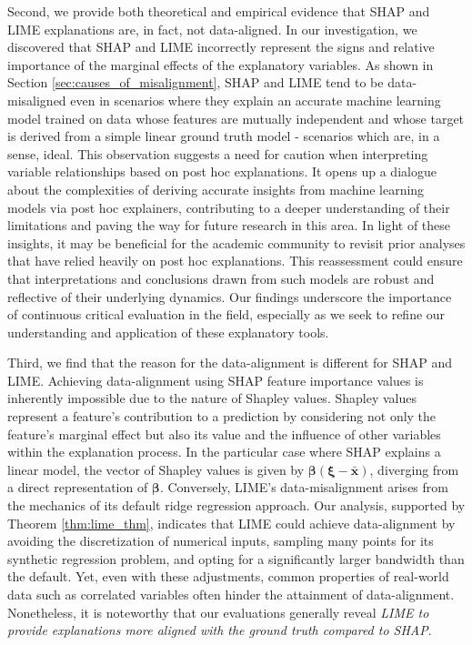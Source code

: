 \documentclass[12pt]{article}  %
\begin{document}
       Second, we provide both theoretical and empirical evidence that SHAP and LIME explanations are, in fact, not data-aligned. In our investigation, we discovered that SHAP and LIME incorrectly represent the signs and relative importance of the marginal effects of the explanatory variables. As shown in Section \ref{sec:causes_of_misalignment}, SHAP and LIME tend to be data-misaligned even in scenarios where they explain an accurate machine learning model trained on data whose features are mutually independent and whose target is derived from a simple linear ground truth model - scenarios which are, in a sense, ideal. This observation suggests a need for caution when interpreting variable relationships based on post hoc explanations. It opens up a dialogue about the complexities of deriving accurate insights from machine learning models via post hoc explainers, contributing to a deeper understanding of their limitations and paving the way for future research in this area. In light of these insights, it may be beneficial for the academic community to revisit prior analyses that have relied heavily on post hoc explanations. This reassessment could ensure that interpretations and conclusions drawn from such models are robust and reflective of their underlying dynamics. Our findings underscore the importance of continuous critical evaluation in the field, especially as we seek to refine our understanding and application of these explanatory tools. %
        
        Third, we find that the reason for the data-alignment is different for SHAP and LIME. Achieving data-alignment using SHAP feature importance values is inherently impossible due to the nature of Shapley values. Shapley values represent a feature's contribution to a prediction by considering not only the feature's marginal effect but also its value and the influence of other variables within the explanation process. In the particular case where SHAP explains a linear model, the vector of Shapley values is given by $\boldsymbol{\beta}(\boldsymbol{\xi}-\bar{\mathbf{x}})$, diverging from a direct representation of $\boldsymbol{\beta}$. Conversely, LIME's data-misalignment arises from the mechanics of its default ridge regression approach. Our analysis, supported by Theorem \ref{thm:lime_thm}, indicates that LIME could achieve data-alignment by avoiding the discretization of numerical inputs, sampling many points for its synthetic regression problem, and opting for a significantly larger bandwidth than the default. Yet, even with these adjustments, common properties of real-world data such as correlated variables often hinder the attainment of data-alignment. Nonetheless, it is noteworthy that our evaluations generally reveal \textit{LIME to provide explanations more aligned with the ground truth compared to SHAP}.
 
\end{document}
